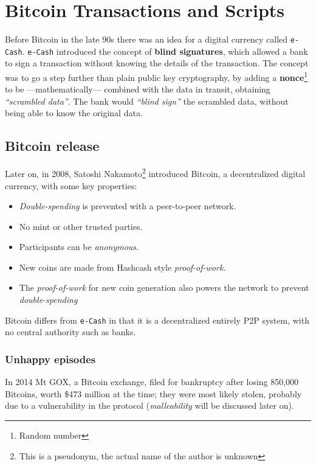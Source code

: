 \chapter{Bitcoin Transactions and Scripts}

Before Bitcoin in the late 90s there was an idea for a digital currency called \texttt{e-Cash}.
\texttt{e-Cash} introduced the concept of \textbf{blind signatures}, which allowed a bank to sign a transaction without knowing the details of the transaction.
The concept was to go a step further than plain public key cryptography, by adding a \textbf{nonce}\footnote{Random number} to be ---mathematically--- combined with the data in transit, obtaining \textit{``scrambled data''}.
The bank would \textit{``blind sign''} the scrambled data, without being able to know the original data.

\section{Bitcoin release}

Later on, in 2008, Satoshi Nakamoto\footnote{This is a pseudonym, the actual name of the author is unknown} introduced Bitcoin, a decentralized digital currency, with some key properties:
\begin{itemize}
   \item \textit{Double-spending} is prevented with a peer-to-peer network.
   \item No mint or other trusted parties.
   \item Participants can be \textit{anonymous}.
   \item New coins are made from Hashcash style \textit{proof-of-work}.
   \item The \textit{proof-of-work} for new coin generation also powers the network to prevent \textit{double-spending}
\end{itemize}

Bitcoin differs from \texttt{e-Cash} in that it is a decentralized entirely P2P system, with no central authority such as banks.

\subsection{Unhappy episodes}
In 2014 Mt GOX, a Bitcoin exchange, filed for bankruptcy after losing 850,000 Bitcoins, worth \$473 million at the time; they were most likely stolen, probably due to a vulnerability in the protocol (\textit{malleability} will be discussed later on).

